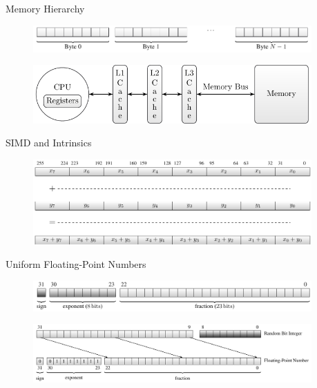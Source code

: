 \documentclass[aspectratio=169]{beamer}
\begin{document}
    \begin{frame}{Memory Hierarchy}
      \begin{figure}
        \includegraphics[width=0.95\textwidth]{figures/memory.pdf}
      \end{figure}
      \begin{figure}
        \includegraphics[width=0.95\textwidth]{figures/memory_hierarchy.pdf}
      \end{figure}
    \end{frame}

    \begin{frame}{SIMD and Intrinsics}
      \begin{figure}
        \includegraphics[width=0.95\textwidth]{figures/simd_vector_operations.pdf}
      \end{figure}
    \end{frame}

    \begin{frame}{Uniform Floating-Point Numbers}
      \begin{figure}
        \includegraphics[width=0.95\textwidth]{figures/floating-point_encoding_single.pdf}
      \end{figure}
      \begin{figure}
        \includegraphics[width=0.95\textwidth]{figures/uniform_implementation_scheme.pdf}
      \end{figure}
    \end{frame}
\end{document}
